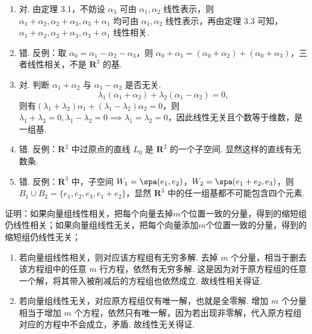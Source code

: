 \begin{exercise}
\begin{exgroup}
\begin{answer}
\begin{enumerate}
                \item 对. 由定理 3.1，不妨设 $\alpha_3$ 可由 $\alpha_1,\alpha_2$ 线性表示，则 $\alpha_1+\alpha_2,\alpha_2+\alpha_3,\alpha_3+\alpha_1$ 均可由 $\alpha_1,\alpha_2$ 线性表示，再由定理 3.3 可知，$\alpha_1+\alpha_2,\alpha_2+\alpha_3,\alpha_3+\alpha_1$ 线性相关.

                \item 错. 反例：取 $\alpha_0=\alpha_1-\alpha_2-\alpha_3$，则 $\alpha_0+\alpha_1=(\alpha_0+\alpha_2)+(\alpha_0+\alpha_3)$，三者线性相关，不是 $\mathbf{R}^3$ 的基.

                \item 对. 判断 $\alpha_1+\alpha_2$ 与 $\alpha_1-\alpha_2$ 是否无关.
                    \[\lambda_1(\alpha_1+\alpha_2)+\lambda_2(\alpha_1-\alpha_2)=0,\]
                    则有$(\lambda_1+\lambda_2)\alpha_1+(\lambda_1-\lambda_2)\alpha_2=0$，则 $\lambda_1+\lambda_2=0,\lambda_1-\lambda_2=0\implies \lambda_1=\lambda_2=0$，因此线性无关且个数等于维数，是一组基.

                \item 错. 反例：$\mathbf{R}^2$ 中过原点的直线 $L_0$ 是 $\mathbf{R}^2$ 的一个子空间. 显然这样的直线有无数条.

                \item 错. 反例：$\mathbf{R}^3$ 中，子空间 $W_1=\spa(e_1,e_2)$，$W_2=\spa(e_1+e_2,e_3)$，则 $B_1\cup B_2=\{e_1,e_2,e_3,e_1+e_2\}$，显然 $\mathbf{R}^3$ 中的任一组基都不可能包含四个元素.
            \end{enumerate}
        \end{answer}

        \item 证明：如果向量组线性相关，把每个向量去掉$m$个位置一致的分量，得到的缩短组仍线性相关；如果向量组线性无关，把每个向量添加$m$个位置一致的分量，得到的缩短组仍线性无关；
        \begin{answer}
            \begin{enumerate}
                \item 若向量组线性相关，则对应该方程组有无穷多解. 去掉 $m$ 个分量，相当于删去该方程组中的任意 $m$ 行方程，依然有无穷多解. 这是因为对于原方程组的任意一个解，将其带入被削减后的方程组也依然成立. 故线性相关得证.

                \item 若向量组线性无关，对应原方程组仅有唯一解，也就是全零解. 增加 $m$ 个分量相当于增加 $m$ 个方程，依然只有唯一解，因为若出现非零解，代入原方程组对应的方程中不会成立，矛盾. 故线性无关得证.
            \end{enumerate}
        \end{answer}


\end{exgroup}
\end{exercise}
